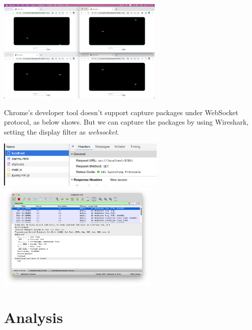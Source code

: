 \documentclass[onecolumn, oneside, ctexart]{SUSTechHomework}
\begin{document}
\centerline{\includegraphics[width=0.6\textwidth]{res/wss}}

\par Chrome's developer tool doesn't support capture packages under WebSocket protocol, as below shows. But we can capture the packages by using Wireshark, setting the display filter as \emph{websocket}.\\

\centerline{\includegraphics[height=6em]{res/wsc}\quad
\includegraphics[height=14em]{res/ws}}

\section{Analysis}
\end{document}
